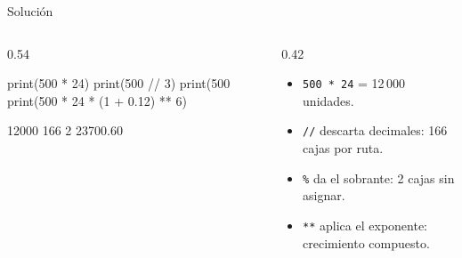 \documentclass[aspectratio=169, 11pt]{beamer}
\begin{document}
\begin{frame}[fragile]{Solución}
  \vspace{-6pt}
  \begin{columns}[T]
    \begin{column}{0.54\textwidth}
      \begin{pyblock}
print(500 * 24)
print(500 // 3)
print(500 %
print(500 * 24 * (1 + 0.12) ** 6)
      \end{pyblock}
      \vspace{-2pt}
      \begin{outputblock}
12000
166
2
23700.60
      \end{outputblock}
    \end{column}

    \begin{column}{0.42\textwidth}
      {\footnotesize\color{textMuted}
      \begin{itemize}\setlength{\itemsep}{4pt}
        \item[{\color{codeGreen}\scriptsize\faCheck}]
          \texttt{500 * 24} = 12\,000 unidades.
        \item[{\color{codeGreen}\scriptsize\faCheck}]
          \texttt{//} descarta decimales:
          166 cajas por ruta.
        \item[{\color{codeGreen}\scriptsize\faCheck}]
          \texttt{\%} da el sobrante:
          2 cajas sin asignar.
        \item[{\color{codeGreen}\scriptsize\faCheck}]
          \texttt{**} aplica el exponente:
          crecimiento compuesto.
      \end{itemize}
      }
    \end{column}
  \end{columns}
\end{frame}
\end{document}
